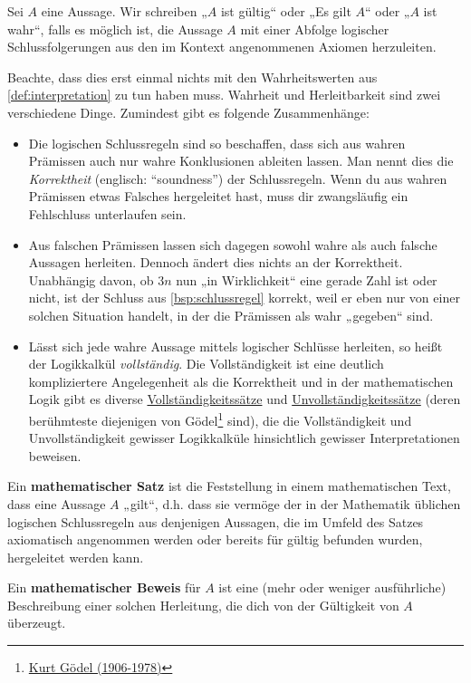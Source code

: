 \begin{defin} \label{def:esgilt}
    Sei $A$ eine Aussage. Wir schreiben „$A$ ist gültig“ oder „Es gilt $A$“ oder „$A$ ist wahr“, falls es möglich ist, die Aussage $A$ mit einer Abfolge logischer Schlussfolgerungen aus den im Kontext angenommenen Axiomen herzuleiten.
\end{defin}
 
 
\begin{bem}
    Beachte, dass dies erst einmal nichts mit den Wahrheitswerten aus \cref{def:interpretation} zu tun haben muss. Wahrheit und Herleitbarkeit sind zwei verschiedene Dinge. Zumindest gibt es folgende Zusammenhänge:
    \begin{itemize}
        \item Die logischen Schlussregeln sind so beschaffen, dass sich aus wahren Prämissen auch nur wahre Konklusionen ableiten lassen. Man nennt dies die \emph{Korrektheit} (englisch: ``soundness'') der Schlussregeln. Wenn du aus wahren Prämissen etwas Falsches hergeleitet hast, muss dir zwangsläufig ein Fehlschluss unterlaufen sein.
        \item Aus falschen Prämissen lassen sich dagegen sowohl wahre als auch falsche Aussagen herleiten. Dennoch ändert dies nichts an der Korrektheit. Unabhängig davon, ob $3n$ nun „in Wirklichkeit“ eine gerade Zahl ist oder nicht, ist der Schluss aus \cref{bsp:schlussregel} korrekt, weil er eben nur von einer solchen Situation handelt, in der die Prämissen als wahr „gegeben“ sind.
        \item Lässt sich jede wahre Aussage mittels logischer Schlüsse herleiten, so heißt der Logikkalkül \emph{vollständig}. Die Vollständigkeit ist eine deutlich kompliziertere Angelegenheit als die Korrektheit und in der mathematischen Logik gibt es diverse \href{https://ncatlab.org/nlab/show/completeness+theorem}{Vollständigkeitssätze} und \href{https://ncatlab.org/nlab/show/incompleteness+theorem}{Unvollständigkeitssätze} (deren berühmteste diejenigen von Gödel\footnote{\href{https://de.wikipedia.org/wiki/Kurt_G\%C3\%B6del}{Kurt Gödel (1906-1978)}} sind), die die Vollständigkeit und Unvollständigkeit gewisser Logikkalküle hinsichtlich gewisser Interpretationen beweisen.
    \end{itemize}
\end{bem}


\begin{defin} 
    Ein \textbf{mathematischer Satz} ist die Feststellung in einem mathematischen Text, dass eine Aussage $A$ „gilt“, d.h. dass sie vermöge der in der Mathematik üblichen logischen Schlussregeln aus denjenigen Aussagen, die im Umfeld des Satzes axiomatisch angenommen werden oder bereits für gültig befunden wurden, hergeleitet werden kann.
    
    Ein \textbf{mathematischer Beweis} für $A$ ist eine (mehr oder weniger ausführliche) Beschreibung einer solchen Herleitung, die dich von der Gültigkeit von $A$ überzeugt.
\end{defin}


